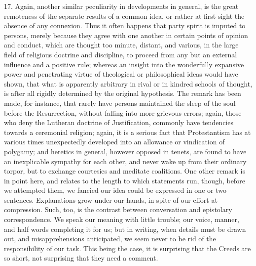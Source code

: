 17. Again, another similar peculiarity in developments in general,
is the great remoteness of the separate results of a common idea, or
rather at first sight the absence of any connexion. Thus it often
happens that party spirit is imputed to persons, merely because they
agree with one another in certain points of opinion and conduct, which
are thought too minute, distant, and various, in the large field of
religious doctrine and discipline, to proceed from any but an external
influence and a positive rule; whereas an insight into the wonderfully
expansive power and penetrating virtue of theological or philosophical
ideas would have shown, that what is apparently arbitrary in rival or
in kindred schools of thought, is after all rigidly determined by the
original hypothesis. The remark has been made, for instance, that
rarely have persons maintained the sleep of the soul before the
Resurrection, without falling into more grievous errors; again, those
who deny the Lutheran doctrine of Justification, commonly have
tendencies towards a ceremonial religion; again, it is a serious fact
that Protestantism has at various times unexpectedly developed into an
allowance or vindication of polygamy; and heretics in general, however
opposed in tenets, are found to have an inexplicable sympathy for each
other, and never wake up from their ordinary torpor, but to exchange
courtesies and meditate coalitions. One other remark is in point here,
and relates to the length to which statements run, though, before we
attempted them, we fancied our idea could be expressed in one or two
sentences. Explanations grow under our hands, in spite of our effort
at compression. Such, too, is the contrast between conversation and
epistolary correspondence. We speak our meaning with little trouble;
our voice, manner, and half words completing it for us; but in
writing, when details must be drawn out, and misapprehensions
anticipated, we seem never to be rid of the responsibility of our
task. This being the case, it is surprising that the Creeds are so
short, not surprising that they need a comment.


